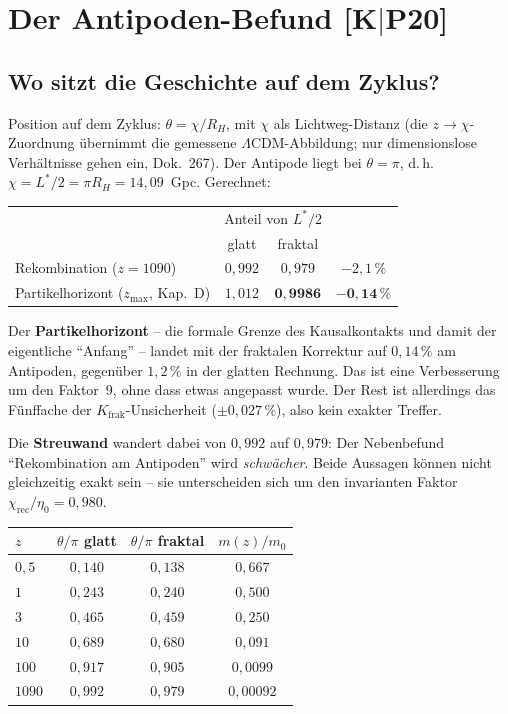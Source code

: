 \chapter{Der Antipoden-Befund [K$|$P20]}

\section{Wo sitzt die Geschichte auf dem Zyklus?}

Position auf dem Zyklus: $\theta = \chi/R_H$, mit $\chi$ als
Lichtweg-Distanz (die $z \to \chi$-Zuordnung übernimmt die
gemessene $\Lambda$CDM-Abbildung; nur dimensionslose Verhältnisse
gehen ein, Dok.~267). Der Antipode liegt bei $\theta = \pi$, d.\,h.
$\chi = L^{*}/2 = \pi R_H = 14{,}09$~Gpc. Gerechnet:

\begin{center}
\begin{tabular}{lccc}
\toprule
 & \multicolumn{2}{c}{Anteil von $L^{*}/2$} & \\
 & glatt & fraktal & \\
\midrule
Rekombination ($z=1090$) & $0{,}992$ & $0{,}979$ & $-2{,}1\,\%$ \\
Partikelhorizont ($z_\text{max}$, Kap.~D) & $1{,}012$ & $\mathbf{0{,}9986}$
  & $\mathbf{-0{,}14\,\%}$ \\
\bottomrule
\end{tabular}
\end{center}

\noindent Der \textbf{Partikelhorizont} -- die formale Grenze des
Kausalkontakts und damit der eigentliche \enquote{Anfang} --
landet mit der fraktalen Korrektur auf $0{,}14\,\%$ am Antipoden,
gegenüber $1{,}2\,\%$ in der glatten Rechnung. Das ist eine
Verbesserung um den Faktor~9, ohne dass etwas angepasst wurde. Der
Rest ist allerdings das Fünffache der $K_\text{frak}$-Unsicherheit
($\pm0{,}027\,\%$), also kein exakter Treffer.

Die \textbf{Streuwand} wandert dabei von $0{,}992$ auf $0{,}979$:
Der Nebenbefund \enquote{Rekombination am Antipoden} wird
\emph{schwächer}. Beide Aussagen können nicht gleichzeitig exakt
sein -- sie unterscheiden sich um den invarianten Faktor
$\chi_\text{rec}/\eta_0 = 0{,}980$.

\begin{center}
\begin{tabular}{lccc}
\toprule
$z$ & $\theta/\pi$ glatt & $\theta/\pi$ fraktal
  & $m(z)/m_0$ \\
\midrule
$0{,}5$ & $0{,}140$ & $0{,}138$ & $0{,}667$ \\
$1$ & $0{,}243$ & $0{,}240$ & $0{,}500$ \\
$3$ & $0{,}465$ & $0{,}459$ & $0{,}250$ \\
$10$ & $0{,}689$ & $0{,}680$ & $0{,}091$ \\
$100$ & $0{,}917$ & $0{,}905$ & $0{,}0099$ \\
$1090$ & $0{,}992$ & $0{,}979$ & $0{,}00092$ \\
\bottomrule
\end{tabular}
\end{center}

